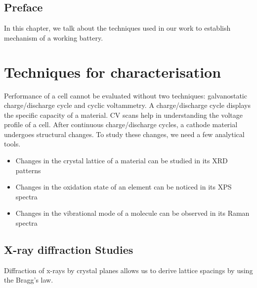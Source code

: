 \section*{Preface}
In this chapter, we talk about the techniques used in our work to establish mechanism of a working battery. 
\pagebreak
\chapter{Techniques for characterisation} %
\label{chap2} %
Performance of a cell cannot be evaluated without two techniques: galvanostatic charge/discharge cycle and cyclic voltammetry. A charge/discharge cycle displays the specific capacity of a material. CV scans help in understanding the voltage profile of a cell.
After continuous charge/discharge cycles, a cathode material undergoes structural changes. To study these changes, we need a few analytical tools. 

\begin{itemize}
    \item Changes in the crystal lattice of a material can be studied in its XRD patterns 
    \item Changes in the oxidation state of an element can be noticed in its XPS spectra
    \item Changes in the vibrational mode of a molecule can be observed in its Raman spectra 
\end{itemize}

\section{X-ray diffraction Studies}
Diffraction of x-rays by crystal planes allows us to derive lattice spacings by using the Bragg's law. 

